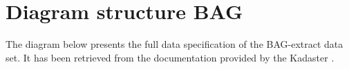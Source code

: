 \chapter{Diagram structure BAG}
\label{chap:DiagramStructureBAG}
The diagram below presents the full data specification of the BAG-extract data set. It has been retrieved from the documentation provided by the Kadaster \cite{BAG14}.
